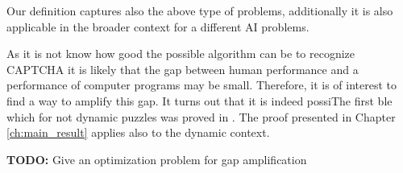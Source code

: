 Our definition captures also the above type of problems, additionally it is also applicable in the broader context for a different
AI problems.

As it is not know how good the possible algorithm can be to recognize CAPTCHA it is likely that the gap between human
performance and a performance of computer programs may be small. Therefore, it is of interest to find a way to amplify this gap.
It turns out that it is indeed possiThe first ble which for not dynamic puzzles was proved in \cite{DBLP:journals/corr/abs-1002-3534}.
The proof presented in Chapter \ref{ch:main_result} applies also to the dynamic context.

\begin{todo}
  \textbf{TODO:} Give an optimization problem for gap amplification
\end{todo}


